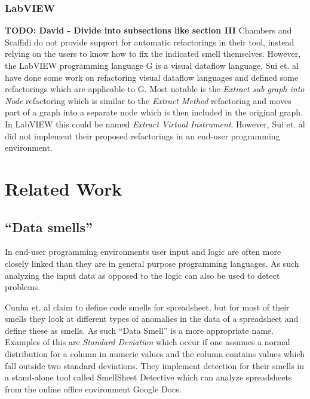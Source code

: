 \documentclass[10pt,conference,compsocconf]{IEEEtran}
\newcommand{\todo}[1]{\textbf{TODO: #1}}
\begin{document}
\subsubsection{LabVIEW}
\todo{David - Divide into subsections like section III}
Chambers and Scaffidi \cite{chambers2013smell} do not provide support for automatic refactorings in their tool, instead relying on the users to know how to fix the indicated smell themselves.
However, the LabVIEW programming language G is a visual dataflow language.
Sui et. al \cite{sui2008automated} have done some work on refactoring visual dataflow languages and defined some refactorings which are applicable to G.
Most notable is the \textit{Extract sub graph into Node} refactoring which is similar to the \textit{Extract Method} refactoring and moves part of a graph into a separate node which is then included in the original graph.
In LabVIEW this could be named \textit{Extract Virtual Instrument}.
However, Sui et. al did not implement their proposed refactorings in an end-user programming environment.







\section{Related Work}
\label{sec:related_work}

\subsection{``Data smells''}
\label{subsec:related_datasmells}

In end-user programming environments user input and logic are often more closely linked than they are in general purpose programming languages.
As such analyzing the input data as opposed to the logic can also be used to detect problems.

Cunha et. al \cite{cunha2012towards} claim to define code smells for spreadsheet, but for most of their smells they look at different types of anomalies in the data of a spreadsheet and define these as smells.
As such ``Data Smell'' is a more appropriate name.
Examples of this are \textit{Standard Deviation} which occur if one assumes a normal distribution for a column in numeric values and the column contains values which fall outside two standard deviations.
They implement detection for their smells in a stand-alone tool called SmellSheet Detective which can analyze spreadsheets from the online office environment Google Docs.
\end{document}
